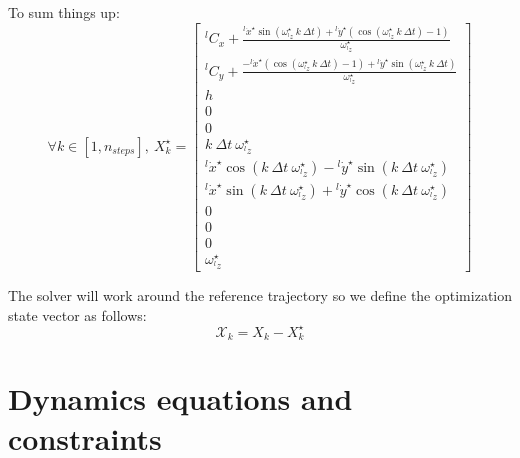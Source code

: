 \documentclass[a4paper,11pt]{article}
\begin{document}
To sum things up:
\begin{equation}
	\forall k \in [1, n_{steps}], ~ X_k^\star = \begin{bmatrix}
	{}^l\! C_x + \frac{{}^l\!\dot x^\star \sin(\omega_{{}^l\!z}^\star ~ k ~ \Delta t) + {}^l\!\dot y^\star \left( \cos(\omega_{{}^l\!z}^\star ~ k ~ \Delta t) - 1 \right)}{\omega_{{}^l\!z}^\star} \\
	{}^l\! C_y + \frac{- {}^l\!\dot x^\star \left( \cos(\omega_{{}^l\!z}^\star ~ k ~ \Delta t) - 1 \right) + {}^l\!\dot y^\star \sin(\omega_{{}^l\!z}^\star ~ k ~ \Delta t)}{\omega_{{}^l\!z}^\star} \\
	h \\ 0 \\ 0 \\ k ~ \Delta t ~  \omega_{{}^l\!z}^\star \\
	{}^l\! \dot x^\star \cos(k ~ \Delta t ~  \omega_{{}^l\!z}^\star) - {}^l\! \dot y^\star \sin(k ~ \Delta t ~  \omega_{{}^l\!z}^\star) \\
	{}^l\! \dot x^\star \sin(k ~ \Delta t ~  \omega_{{}^l\!z}^\star) + {}^l\! \dot y^\star \cos(k ~ \Delta t ~  \omega_{{}^l\!z}^\star) \\ 0 \\ 0 \\ 0 \\ \omega_{{}^l\!z}^\star
	\end{bmatrix}
\end{equation}



The solver will work around the reference trajectory so we define the optimization state vector as follows:
\begin{equation}\mathcal{X}_k = X_k - X_k^\star \end{equation}

\newpage
\section{Dynamics equations and constraints}
\end{document}
